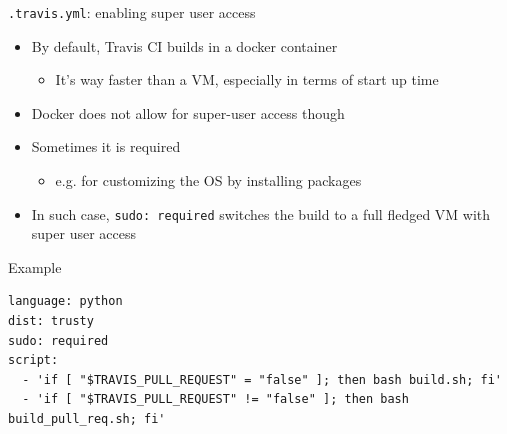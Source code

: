 \documentclass[presentation]{beamer}
\begin{document}
\begin{frame}[fragile]{\texttt{.travis.yml}: enabling super user access}
    \begin{itemize}
        \item By default, Travis CI builds in a docker container
        \begin{itemize}
            \item It's way faster than a VM, especially in terms of start up time
        \end{itemize}
        \item Docker does not allow for super-user access though
        \item Sometimes it is required
        \begin{itemize}
            \item e.g. for customizing the OS by installing packages
        \end{itemize}
        \item In such case, \texttt{sudo: required} switches the build to a full fledged VM with super user access
    \end{itemize}
    \begin{block}{Example}
        \begin{verbatim}
language: python
dist: trusty
sudo: required
script:
  - 'if [ "$TRAVIS_PULL_REQUEST" = "false" ]; then bash build.sh; fi'
  - 'if [ "$TRAVIS_PULL_REQUEST" != "false" ]; then bash build_pull_req.sh; fi'
        \end{verbatim}
    \end{block}
\end{frame}
\end{document}
